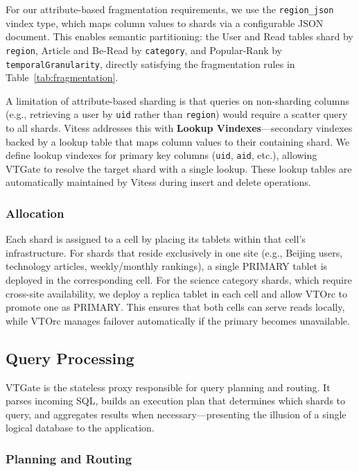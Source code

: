 \documentclass{article}
\begin{document}
For our attribute-based fragmentation requirements, we use the \texttt{region\_json} vindex type, which maps column values to shards via a configurable JSON document. This enables semantic partitioning: the User and Read tables shard by \texttt{region}, Article and Be-Read by \texttt{category}, and Popular-Rank by \texttt{temporalGranularity}, directly satisfying the fragmentation rules in Table~\ref{tab:fragmentation}.

A limitation of attribute-based sharding is that queries on non-sharding columns (e.g., retrieving a user by \texttt{uid} rather than \texttt{region}) would require a scatter query to all shards. Vitess addresses this with \textbf{Lookup Vindexes}---secondary vindexes backed by a lookup table that maps column values to their containing shard. We define lookup vindexes for primary key columns (\texttt{uid}, \texttt{aid}, etc.), allowing VTGate to resolve the target shard with a single lookup. These lookup tables are automatically maintained by Vitess during insert and delete operations.

\subsubsection{Allocation}

Each shard is assigned to a cell by placing its tablets within that cell's infrastructure. For shards that reside exclusively in one site (e.g., Beijing users, technology articles, weekly/monthly rankings), a single PRIMARY tablet is deployed in the corresponding cell. For the science category shards, which require cross-site availability, we deploy a replica tablet in each cell and allow VTOrc to promote one as PRIMARY. This ensures that both cells can serve reads locally, while VTOrc manages failover automatically if the primary becomes unavailable.

\subsection{Query Processing}

VTGate is the stateless proxy responsible for query planning and routing. It parses incoming SQL, builds an execution plan that determines which shards to query, and aggregates results when necessary—presenting the illusion of a single logical database to the application.

\subsubsection{Planning and Routing}
\end{document}
